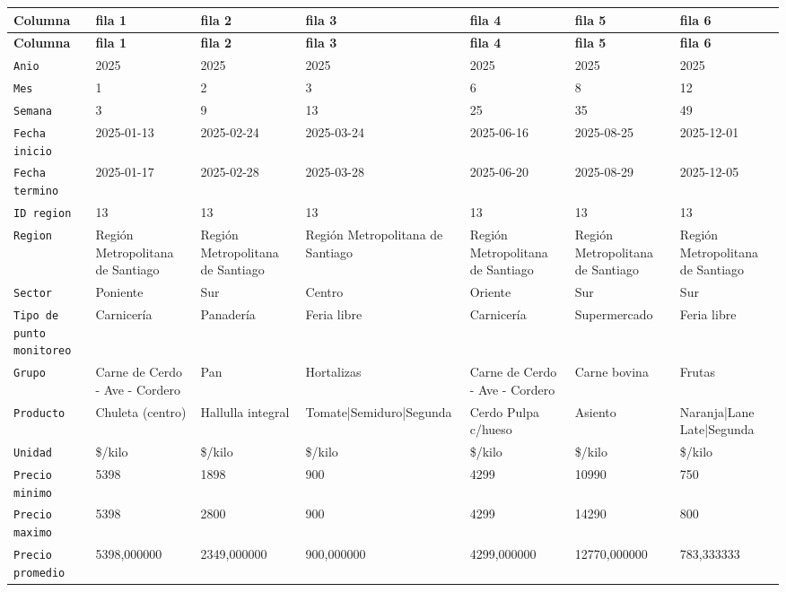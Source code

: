 \documentclass[10pt]{article}
\newcommand{\hdr}[1]{\textbf{\color{white}#1}}
\begin{document}
\footnotesize
\begin{xltabular}{\linewidth}{@{}p{4.3cm} Y Y Y Y Y Y @{}}
\hdr{Columna} & \hdr{fila 1} & \hdr{fila 2} & \hdr{fila 3} & \hdr{fila 4} & \hdr{fila 5} & \hdr{fila 6} \\
\endfirsthead
{}\hdr{Columna} & \hdr{fila 1} & \hdr{fila 2} & \hdr{fila 3} & \hdr{fila 4} & \hdr{fila 5} & \hdr{fila 6} \\
\endhead
{}\texttt{Anio} & 2025 & 2025 & 2025 & 2025 & 2025 & 2025 \\
\texttt{Mes} & 1 & 2 & 3 & 6 & 8 & 12 \\
\texttt{Semana} & 3 & 9 & 13 & 25 & 35 & 49 \\
\texttt{Fecha inicio} & 2025-{}01-{}13 & 2025-{}02-{}24 & 2025-{}03-{}24 & 2025-{}06-{}16 & 2025-{}08-{}25 & 2025-{}12-{}01 \\
\texttt{Fecha termino} & 2025-{}01-{}17 & 2025-{}02-{}28 & 2025-{}03-{}28 & 2025-{}06-{}20 & 2025-{}08-{}29 & 2025-{}12-{}05 \\
\texttt{ID region} & 13 & 13 & 13 & 13 & 13 & 13 \\
\texttt{Region} & Región Metropolitana de Santiago & Región Metropolitana de Santiago & Región Metropolitana de Santiago & Región Metropolitana de Santiago & Región Metropolitana de Santiago & Región Metropolitana de Santiago \\
\texttt{Sector} & Poniente & Sur & Centro & Oriente & Sur & Sur \\
\texttt{Tipo de punto monitoreo} & Carnicería & Panadería & Feria libre & Carnicería & Supermercado & Feria libre \\
\texttt{Grupo} & Carne de Cerdo -{} Ave -{} Cordero & Pan & Hortalizas & Carne de Cerdo -{} Ave -{} Cordero & Carne bovina & Frutas \\
\texttt{Producto} & Chuleta (centro) & Hallulla integral & Tomate|Se\allowbreak{}miduro|Se\allowbreak{}gunda & Cerdo Pulpa c/hueso & Asiento & Naranja|Lane Late|Segunda \\
\texttt{Unidad} & \$/kilo & \$/kilo & \$/kilo & \$/kilo & \$/kilo & \$/kilo \\
\texttt{Precio minimo} & 5398 & 1898 & 900 & 4299 & 10990 & 750 \\
\texttt{Precio maximo} & 5398 & 2800 & 900 & 4299 & 14290 & 800 \\
\texttt{Precio promedio} & 5398,000000 & 2349,000000 & 900,000000 & 4299,000000 & 12770,000000 & 783,333333 \\
\end{xltabular}
\normalsize
\end{document}
